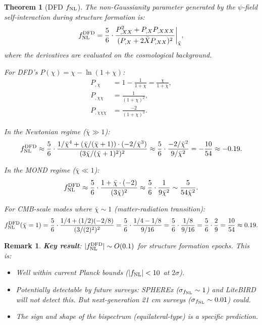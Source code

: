 \documentclass[11pt,a4paper]{article}
\newtheorem{theorem}{Theorem}
\newtheorem{remark}{Remark}
\begin{document}
\begin{theorem}[DFD $f_{\rm NL}$]
\label{thm:fNL}
The non-Gaussianity parameter generated by the $\psi$-field self-interaction during structure formation is:
\begin{equation}\label{eq:fNL}
f_{\rm NL}^{\rm DFD} = \frac{5}{6}\cdot\frac{P_{,XX}^2 + P_{,X}P_{,XXX}}{(P_{,X} + 2\bar XP_{,XX})^2}\bigg|_{\bar\chi},
\end{equation}
where the derivatives are evaluated on the cosmological background.

For DFD's $P(\chi) = \chi - \ln(1+\chi)$:
\begin{align}
P_{,\chi} &= 1 - \frac{1}{1+\chi} = \frac{\chi}{1+\chi}, \\
P_{,\chi\chi} &= \frac{1}{(1+\chi)^2}, \\
P_{,\chi\chi\chi} &= \frac{-2}{(1+\chi)^3}.
\end{align}

In the Newtonian regime ($\bar\chi \gg 1$):
\begin{equation}
f_{\rm NL}^{\rm DFD} \approx \frac{5}{6}\cdot\frac{1/\bar\chi^4 + (\bar\chi/(\bar\chi+1))\cdot(-2/\bar\chi^3)}{(3\bar\chi/(\bar\chi+1)^2)^2} \approx \frac{5}{6}\cdot\frac{-2/\bar\chi^2}{9/\bar\chi^2} = -\frac{10}{54} \approx -0.19.
\end{equation}

In the MOND regime ($\bar\chi \ll 1$):
\begin{equation}
f_{\rm NL}^{\rm DFD} \approx \frac{5}{6}\cdot\frac{1 + \bar\chi\cdot(-2)}{(3\bar\chi)^2} \approx \frac{5}{6}\cdot\frac{1}{9\bar\chi^2} \sim \frac{5}{54\bar\chi^2}.
\end{equation}

For CMB-scale modes where $\bar\chi \sim 1$ (matter-radiation transition):
\begin{equation}
f_{\rm NL}^{\rm DFD}(\bar\chi = 1) = \frac{5}{6}\cdot\frac{1/4 + (1/2)(-2/8)}{(3/(2)^2)^2} = \frac{5}{6}\cdot\frac{1/4 - 1/8}{9/16} = \frac{5}{6}\cdot\frac{1/8}{9/16} = \frac{5}{6}\cdot\frac{2}{9} = \frac{10}{54} \approx 0.19.
\end{equation}
\end{theorem}

\begin{remark}
\textbf{Key result}: $|f_{\rm NL}^{\rm DFD}| \sim O(0.1)$ for structure formation epochs. This is:
\begin{itemize}
\item Well within current Planck bounds ($|f_{\rm NL}| < 10$ at $2\sigma$).
\item Potentially detectable by future surveys: SPHEREx ($\sigma_{f_{\rm NL}} \sim 1$) and LiteBIRD will not detect this. But next-generation 21 cm surveys ($\sigma_{f_{\rm NL}} \sim 0.01$) could.
\item The sign and shape of the bispectrum (equilateral-type) is a specific prediction.
\end{itemize}
\end{remark}
\end{document}
